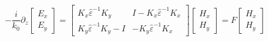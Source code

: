 \documentclass[a4paper,10pt]{report}
\begin{document}
\begin{equation}
-\frac{i}{k_0} \partial_z \left[ \begin{array}{c} E_x \\ E_y \end{array} \right] =
\left[ \begin{array}{cc} K_x \hat{\varepsilon}^{-1} K_y & I - K_x \hat{\varepsilon}^{-1} K_x \\ K_y \hat{\varepsilon}^{-1} K_y - I & -K_y \hat{\varepsilon}^{-1} K_x \end{array} \right]
\left[ \begin{array}{c} H_x \\ H_y \end{array} \right] =
F \left[ \begin{array}{c} H_x \\ H_y \end{array} \right]
\end{equation}
\end{document}
